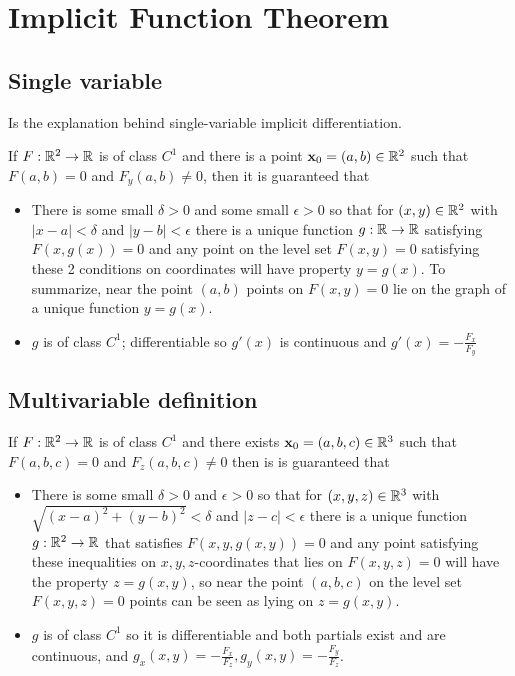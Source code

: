 \section{Implicit Function Theorem}

\subsection{Single variable}

Is the explanation behind single-variable implicit differentiation.

If $F:\mathbb{R}^2\to \mathbb{R}$ is of class $C^1$ and there is a point $\textbf{x}_0=(a,b)\in\mathbb{R}^2$ such that 
$F(a,b)=0$ and $F_y(a,b)\neq 0$, then it is guaranteed that
\begin{itemize}
    \item There is some small $\delta>0$ and some small $\epsilon>0$ so that for $(x,y)\in\mathbb{R}^2$ with $|x-a|<\delta$ and $|y-b|<\epsilon$ there is a unique function $g:\mathbb{R}\to\mathbb{R}$ satisfying
    $F(x,g(x))=0$ and any point on the level set $F(x,y)=0$ satisfying these 2 conditions on coordinates will have property $y=g(x)$. To summarize, near the point $(a,b)$ points on $F(x,y)=0$ lie on the graph of a unique function $y=g(x)$.
    \item $g$ is of class $C^1$; differentiable so $g'(x)$ is continuous and $g'(x)=-\frac{F_x}{F_y}$
\end{itemize}

\subsection{Multivariable definition}

If $F:\mathbb{R}^2\to \mathbb{R}$ is of class $C^1$ and there exists $\textbf{x}_0=(a,b,c)\in\mathbb{R}^3$ such that
$F(a,b,c)=0$ and $F_z(a,b,c)\neq 0$ then is is guaranteed that
\begin{itemize}
    \item There is some small $\delta > 0$ and $\epsilon > 0$ so that for $(x,y,z)\in\mathbb{R}^3$ with $\sqrt{(x-a)^2+(y-b)^2}<\delta$ and $|z-c|<\epsilon$ there is a unique function $g:\mathbb{R}^2\to\mathbb{R}$
    that satisfies $F(x,y,g(x,y))=0$ and any point satisfying these inequalities on $x,y,z$-coordinates that lies on $F(x,y,z)=0$ will have the property $z=g(x,y)$, so near the point $(a,b,c)$ on the level set $F(x,y,z)=0$ points can be seen as lying on $z=g(x,y)$.
    \item $g$ is of class $C^1$ so it is differentiable and both partials exist and are continuous, and $g_x(x,y)=-\frac{F_x}{F_z},g_y(x,y)=-\frac{F_y}{F_z}$.
\end{itemize}

